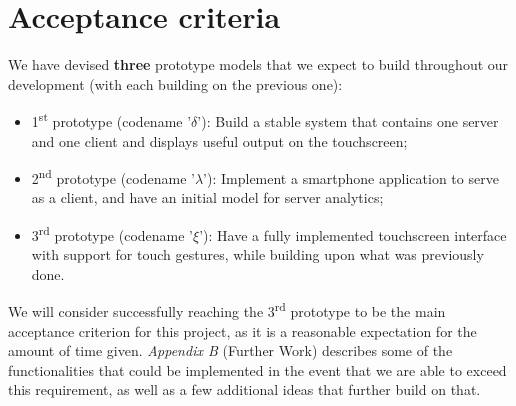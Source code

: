 \documentclass[12p, a4paper, onecolumn]{report}
\begin{document}
\section{Acceptance criteria}

We have devised \textbf{three} prototype models that we expect to build throughout our development (with each building on the previous one):
\begin{itemize}
\item 1\textsuperscript{st} prototype (codename '$\delta$'): Build a stable system that contains one server and one client and displays useful output on the touchscreen;
\item 2\textsuperscript{nd} prototype (codename '$\lambda$'): Implement a smartphone application to serve as a client, and have an initial model for server analytics;
\item 3\textsuperscript{rd} prototype (codename '$\xi$'): Have a fully implemented touchscreen interface with support for touch gestures, while building upon what was previously done.
\end{itemize}
We will consider successfully reaching the 3\textsuperscript{rd} prototype to be the main acceptance criterion for this project, as it is a reasonable expectation for the amount of time given. \emph{Appendix B} (Further Work) describes some of the functionalities that could be implemented in the event that we are able to exceed this requirement, as well as a few additional ideas that further build on that. 
\end{document}
